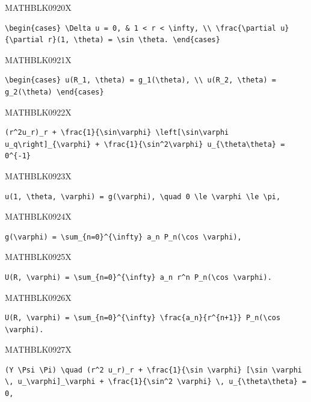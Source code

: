 \documentclass[
  ukrainian,
]{article}
\begin{document}
MATHBLK0920X

\begin{verbatim}
\begin{cases} \Delta u = 0, & 1 < r < \infty, \\ \frac{\partial u}{\partial r}(1, \theta) = \sin \theta. \end{cases}
\end{verbatim}

MATHBLK0921X

\begin{verbatim}
\begin{cases} u(R_1, \theta) = g_1(\theta), \\ u(R_2, \theta) = g_2(\theta) \end{cases}
\end{verbatim}

MATHBLK0922X

\begin{verbatim}
(r^2u_r)_r + \frac{1}{\sin\varphi} \left[\sin\varphi u_q\right]_{\varphi} + \frac{1}{\sin^2\varphi} u_{\theta\theta} = 0^{-1}
\end{verbatim}

MATHBLK0923X

\begin{verbatim}
u(1, \theta, \varphi) = g(\varphi), \quad 0 \le \varphi \le \pi,
\end{verbatim}

MATHBLK0924X

\begin{verbatim}
g(\varphi) = \sum_{n=0}^{\infty} a_n P_n(\cos \varphi),
\end{verbatim}

MATHBLK0925X

\begin{verbatim}
U(R, \varphi) = \sum_{n=0}^{\infty} a_n r^n P_n(\cos \varphi).
\end{verbatim}

MATHBLK0926X

\begin{verbatim}
U(R, \varphi) = \sum_{n=0}^{\infty} \frac{a_n}{r^{n+1}} P_n(\cos \varphi).
\end{verbatim}

MATHBLK0927X

\begin{verbatim}
(Y \Psi \Pi) \quad (r^2 u_r)_r + \frac{1}{\sin \varphi} [\sin \varphi \, u_\varphi]_\varphi + \frac{1}{\sin^2 \varphi} \, u_{\theta\theta} = 0,
\end{verbatim}
\end{document}
